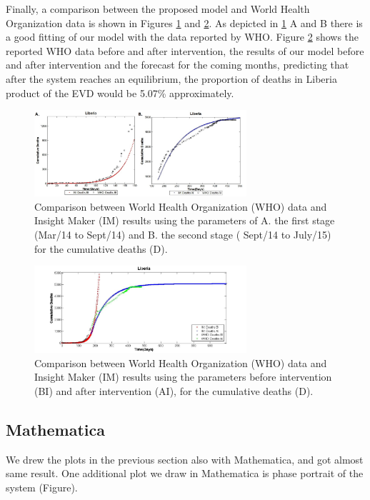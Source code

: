
\noindent Finally, a comparison between the proposed model and World Health Organization data is shown in Figures \ref{fig:LB_IM_WHO} and \ref{fig:LB_IM_WHO2}. As depicted in \ref{fig:LB_IM_WHO} A and B there is a good fitting of our model with the data reported by WHO. Figure \ref{fig:LB_IM_WHO2} shows  the reported WHO data before and after intervention, the results of our model before and after intervention and the forecast for the coming months, predicting that after the system reaches an equilibrium, the proportion of deaths in Liberia product of the EVD would be 5.07\% approximately.


\begin{figure}[!h]
  \centering
  \includegraphics[width=0.7\textwidth]{LB_BI_AI_SD_WHO_IM}
  \caption{ Comparison between World Health Organization (WHO) data and Insight Maker (IM) results using the parameters of A. the first stage (Mar/14 to Sept/14) and B. the second stage ( Sept/14 to July/15) for the cumulative deaths (D).}
\label{fig:LB_IM_WHO} 
\end{figure}



\begin{figure}[!h]
  \centering
  \includegraphics[width=0.7\textwidth]{LB_Int2_SD_WHO_IM}
  \caption{ Comparison between World Health Organization (WHO) data and Insight Maker (IM) results using the parameters before intervention (BI) and after intervention (AI), for the cumulative deaths (D).}
\label{fig:LB_IM_WHO2} 
\end{figure}


\newpage
\subsection{Mathematica}
We drew the plots in the previous section also with Mathematica, and got almost same result. One additional plot we draw in Mathematica is phase portrait of the system (Figure).

